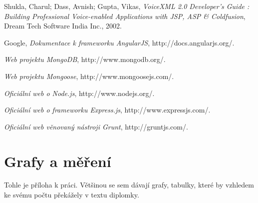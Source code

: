 \documentclass[ing,male,java,dept460]{diploma}						%
\begin{document}
\begin{thebibliography}{99}

 Shukla, Charul; Dass, Avnish; Gupta, Vikas,
\textit{VoiceXML 2.0 Developer's Guide : Building Professional Voice-enabled Applications with JSP, ASP & Coldfusion}, Dream Tech Software India Inc., 2002.

 Google,
\textit{Dokumentace k frameworku AngularJS}, http://docs.angularjs.org/.

\textit{Web projektu MongoDB}, http://www.mongodb.org/.

\textit{Web projektu Mongoose}, http://www.mongoosejs.com/.

\textit{Oficiální web o Node.js}, http://www.nodejs.org/.

\textit{Oficiální web o frameworku Express.js}, http://www.expressjs.com/.

\textit{Oficiální web věnovaný nástroji Grunt}, http://gruntjs.com/.

\end{thebibliography}

\appendix
\section{Grafy a měření}
Tohle je příloha k práci. Většinou se sem dávají grafy, tabulky, které by vzhledem
ke svému počtu překážely v textu diplomky.
\clearpage
\end{document}
